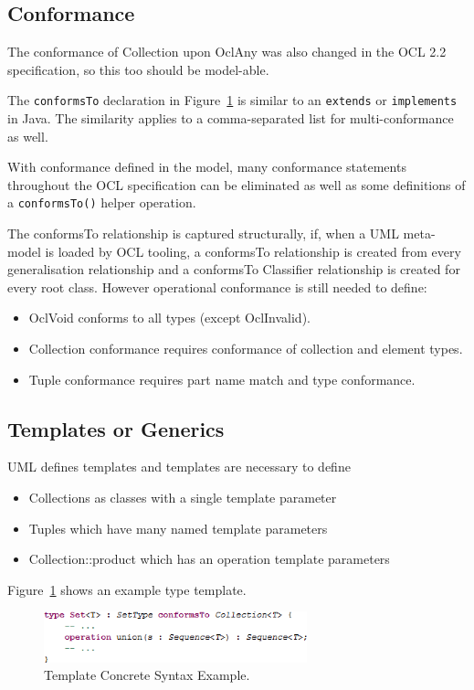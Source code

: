 \documentclass{eceasst}
\begin{document}
\subsection{Conformance}

The conformance of Collection upon OclAny was also changed in the OCL 2.2 specification, so this too should be model-able.

The \verb|conformsTo| declaration in Figure~\ref{fig:TemplateExample} is similar to an \verb|extends| or \verb|implements| in Java. The similarity applies to a comma-separated list for multi-conformance as well.

With conformance defined in the model, many conformance statements throughout the OCL specification can be eliminated as well as some definitions of a \verb|conformsTo()| helper operation.

The conformsTo relationship is captured structurally, if, when a UML meta-model is loaded by OCL tooling, a conformsTo relationship is created from every generalisation relationship and a conformsTo Classifier relationship is created for every root class. However operational conformance is still needed to define:

\begin{itemize}
\item OclVoid conforms to all types (except OclInvalid).
\item Collection conformance requires conformance of collection and element types.
\item Tuple conformance requires part name match and type conformance.
\end{itemize}

\subsection{Templates or Generics}

UML defines templates and templates are necessary to define
\begin{itemize}
\item Collections as classes with a single template parameter
\item Tuples which have many named template parameters
\item Collection::product which has an operation template parameters
\end{itemize}

Figure~\ref{fig:TemplateExample} shows an example type template.

\begin{figure}
  \begin{center}
    \includegraphics[width=3.0in]{TemplateExample.png}
  \end{center}
  \caption{Template Concrete Syntax Example.}
  \label{fig:TemplateExample}
\end{figure}
\end{document}
